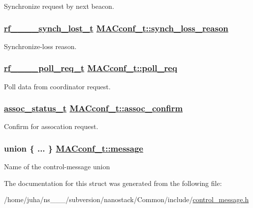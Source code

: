 Synchronize request by next beacon. \hypertarget{structMACconf__t_1e2659ba9ca3c9393ed0b6b4b4b095ec}{
\subsubsection[synch\_\-loss\_\-reason]{\setlength{\rightskip}{0pt plus 5cm}\hyperlink{structrf__802__15__4__synch__lost__t}{rf\_\_\_\_\-synch\_\-lost\_\-t} \hyperlink{structMACconf__t_1e2659ba9ca3c9393ed0b6b4b4b095ec}{MACconf\_\-t::synch\_\-loss\_\-reason}}}
\label{structMACconf__t_1e2659ba9ca3c9393ed0b6b4b4b095ec}


Synchronize-loss reason. \hypertarget{structMACconf__t_33c70a1389613a28534827454b214c78}{
\subsubsection[poll\_\-req]{\setlength{\rightskip}{0pt plus 5cm}\hyperlink{structrf__802__15__4__poll__req__t}{rf\_\_\_\_\-poll\_\-req\_\-t} \hyperlink{structMACconf__t_33c70a1389613a28534827454b214c78}{MACconf\_\-t::poll\_\-req}}}
\label{structMACconf__t_33c70a1389613a28534827454b214c78}


Poll data from coordinator request. \hypertarget{structMACconf__t_1a8fef873257b76abe7e7058001a6ea9}{
\subsubsection[assoc\_\-confirm]{\setlength{\rightskip}{0pt plus 5cm}\hyperlink{rf__802__15__4_8h_8dd8e855fea9627a62ab967a7b3b47af}{assoc\_\-status\_\-t} \hyperlink{structMACconf__t_1a8fef873257b76abe7e7058001a6ea9}{MACconf\_\-t::assoc\_\-confirm}}}
\label{structMACconf__t_1a8fef873257b76abe7e7058001a6ea9}


Confirm for assocation request. \hypertarget{structMACconf__t_6f1770beed1fc26677997b27799bb364}{
\subsubsection[message]{\setlength{\rightskip}{0pt plus 5cm}union \{ ... \}  \hyperlink{structMACconf__t_6f1770beed1fc26677997b27799bb364}{MACconf\_\-t::message}}}
\label{structMACconf__t_6f1770beed1fc26677997b27799bb364}


Name of the control-message union 

The documentation for this struct was generated from the following file:\begin{CompactItemize}
\item 
/home/juha/ns\_\_\_/subversion/nanostack/Common/include/\hyperlink{control__message_8h}{control\_\-message.h}\end{CompactItemize}

